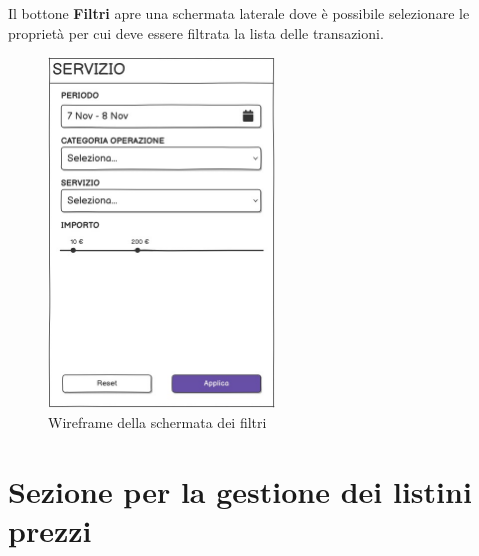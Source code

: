 Il bottone \textbf{Filtri} apre una schermata laterale dove \`e possibile selezionare le propriet\`a per cui deve essere filtrata la lista delle transazioni.

\begin{figure}[H]
  \centering
  \includegraphics[width=6cm]{images/gestione-wallet/mock-filtri-ricerca.png}
  \caption{Wireframe della schermata dei filtri}
\end{figure}

\section{Sezione per la gestione dei listini prezzi}
